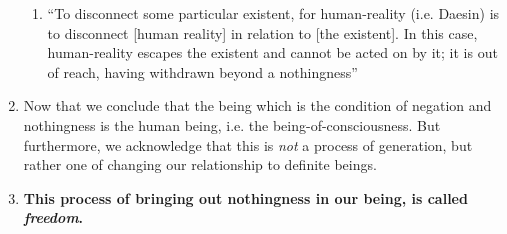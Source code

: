 \begin{enumerate}
  \begin{enumerate}
    \item \enquote{To disconnect some particular existent, for human-reality (i.e. Daesin) is to disconnect [human reality] in relation to [the existent]. In this case, human-reality escapes the existent and cannot be acted on by it; it is out of reach, having withdrawn beyond a nothingness}
  \end{enumerate}
  \item Now that we conclude that the being which is the condition of negation and nothingness is the human being, i.e. the being-of-consciousness. But furthermore, we acknowledge that this is \emph{not} a process of generation, but rather one of changing our relationship to definite beings.
  \item \textbf{This process of bringing out nothingness in our being, is called \emph{freedom}.}


\end{enumerate}
